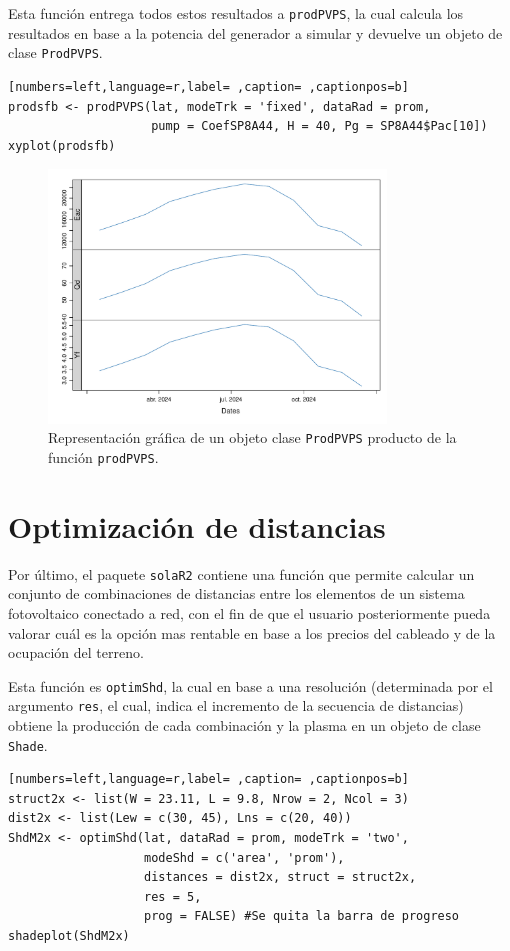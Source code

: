 \begin{itemize}
Esta función entrega todos estos resultados a \texttt{prodPVPS}, la cual calcula los resultados en base a la potencia del generador a simular y devuelve un objeto de clase \texttt{ProdPVPS}.
\begin{lstlisting}[numbers=left,language=r,label= ,caption= ,captionpos=b]
prodsfb <- prodPVPS(lat, modeTrk = 'fixed', dataRad = prom,
                    pump = CoefSP8A44, H = 40, Pg = SP8A44$Pac[10])
xyplot(prodsfb)
\end{lstlisting}

\begin{figure}[!htb]
\centering
\includegraphics[width=0.8\textwidth]{figuras/codigo-prodpvps.pdf}
\caption{Representación gráfica de un objeto clase \texttt{ProdPVPS} producto de la función \texttt{prodPVPS}.}
\end{figure}
\end{itemize}
\section{Optimización de distancias}
\label{sec:org7ab9e30}
\label{optimizacion-distancias}
Por último, el paquete \texttt{solaR2} contiene una función que permite calcular un conjunto de combinaciones de distancias entre los elementos de un sistema fotovoltaico conectado a red, con el fin de que el usuario posteriormente pueda valorar cuál es la opción mas rentable en base a los precios del cableado y de la ocupación del terreno.

Esta función es \texttt{optimShd}, la cual en base a una resolución (determinada por el argumento \texttt{res}, el cual, indica el incremento de la secuencia de distancias) obtiene la producción de cada combinación y la plasma en un objeto de clase \texttt{Shade}.
\begin{lstlisting}[numbers=left,language=r,label= ,caption= ,captionpos=b]
struct2x <- list(W = 23.11, L = 9.8, Nrow = 2, Ncol = 3)
dist2x <- list(Lew = c(30, 45), Lns = c(20, 40))
ShdM2x <- optimShd(lat, dataRad = prom, modeTrk = 'two',
                   modeShd = c('area', 'prom'),
                   distances = dist2x, struct = struct2x,
                   res = 5,
                   prog = FALSE) #Se quita la barra de progreso
shadeplot(ShdM2x)
\end{lstlisting}

